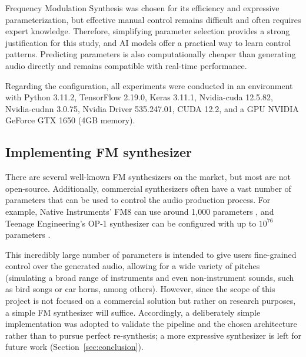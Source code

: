 \documentclass[10pt,conference]{IEEEtran}
\begin{document}
Frequency Modulation Synthesis was chosen for its efficiency and expressive parameterization, but effective manual control remains difficult and often requires expert knowledge. Therefore, simplifying parameter selection provides a strong justification for this study, and AI models offer a practical way to learn control patterns. Predicting parameters is also computationally cheaper than generating audio directly and remains compatible with real-time performance.

Regarding the configuration, all experiments were conducted in an environment with Python 3.11.2, TensorFlow 2.19.0, Keras 3.11.1, Nvidia-cuda 12.5.82, Nvidia-cudnn 3.0.75, Nvidia Driver 535.247.01, CUDA 12.2, and a GPU NVIDIA GeForce GTX 1650 (4GB memory).


\subsection{Implementing FM synthesizer}

There are several well-known FM synthesizers on the market, but most are not open-source. Additionally, commercial synthesizers often have a vast number of parameters that can be used to control the audio production process. For example, Native Instruments' FM8 can use around 1,000 parameters \cite{claesson2021resynthesis}, and Teenage Engineering’s OP-1 synthesizer can be configured with up to $10^{76}$ parameters \cite{claesson2021resynthesis}.

This incredibly large number of parameters is intended to give users fine-grained control over the generated audio, allowing for a wide variety of pitches (simulating a broad range of instruments and even non-instrument sounds, such as bird songs or car horns, among others). However, since the scope of this project is not focused on a commercial solution but rather on research purposes, a simple FM synthesizer will suffice. Accordingly, a deliberately simple implementation was adopted to validate the pipeline and the chosen architecture rather than to pursue perfect re-synthesis; a more expressive synthesizer is left for future work (Section~\ref{sec:conclusion}).
\end{document}
